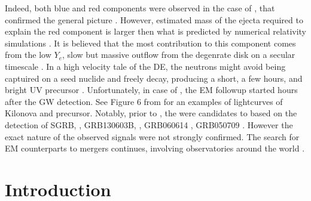 %
Indeed, both blue and red components were observed in the case of \AT{}, that confirmed the general picture
\citep[\eg][]{Villar:2017wcc}. However, estimated mass of the ejecta required to explain the red component 
is larger then what is predicted by numerical relativity simulations . It is believed that the most 
contribution to this component comes from the low $Y_e$, slow but massive outflow 
from the degenrate disk on a secular timescale .
%
In a high velocity tale of the \ac{DE}, the neutrons might avoid being captuired on a seed nuclide and freely 
decay, producing a short, a few hours, and bright \ac{UV} precursor \citep{Metzger:2014yda}. 
Unfortunately, in case of \AT{}, the \ac{EM} followup started  hours after the \ac{GW} detection.
%
See Figure 6 from \cite{Metzger:2016pju} for an examples of lightcurves of Kilonova and precursor.
%
% 
Notably, prior to \AT{}, the were candidates to based on the detection of \ac{SGRB}, \eg, 
GRB130603B, \citep{Berger:2013wna,Tanvir:2013pia}, 
GRB060614 \citep{Jin:2015txa,Yang:2015pha}, 
GRB050709 \citep{Jin:2016pnm}. 
However the exact nature of the observed signals were not strongly confirmed. 
%
The search for \ac{EM} counterparts to mergers continues, involving observatories around the world \citep{Law:2009,Singer:2014qca,Bellm:2014,Kasliwal:2016uhu}.
%


\cite{Lee:2007js,Nakar:2007yr,Gehrels:2009,Fernandez:2015use}
















\section{Introduction}


